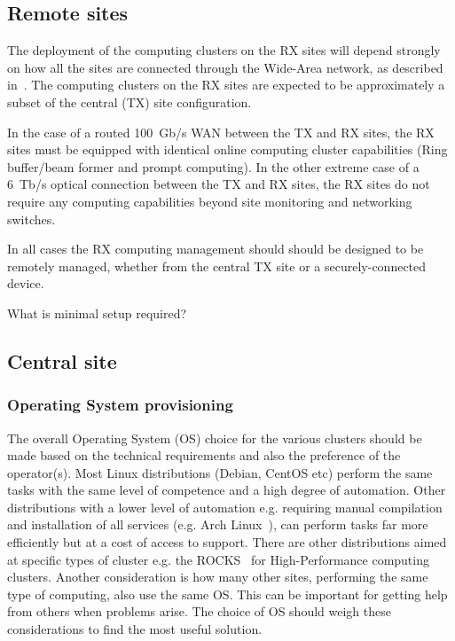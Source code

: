 \documentclass[12pt,a4paper]{article}
\begin{document}
\subsection{Remote sites}
\label{sec:remote}

The deployment of the computing clusters on the RX sites will depend strongly on how all the sites are connected through the Wide-Area network, as described in~\cite{e3dds-del-1-1}.
The computing clusters on the RX sites are expected to be  approximately a subset of the central (TX) site configuration.

In the case of a routed 100~Gb/s WAN between the TX and RX sites, the RX sites must be equipped with identical online computing cluster capabilities (Ring buffer/beam former and prompt computing).
In the other extreme case of a 6~Tb/s optical connection between the TX and RX sites, the RX sites do not require any computing capabilities beyond site monitoring and networking switches.

In all cases the RX computing management should should be designed to be remotely managed, whether from the central TX site or a securely-connected device.

What is minimal setup required?

\subsection{Central site}
\label{sec:central}


\subsubsection{Operating System provisioning}
\label{ssec:os-prov}
The overall Operating System (OS) choice for the various clusters should be made based on the technical requirements and also the preference of the operator(s).
Most Linux distributions (Debian, CentOS etc) perform the same tasks with the same level of competence and a high degree of automation.
Other distributions with a lower level of automation e.g. requiring manual compilation and installation of all services (e.g. Arch Linux~\cite{archlinux}), can perform tasks far more efficiently but at a cost of access to support.  
There are other distributions aimed at specific types of cluster e.g. the ROCKS~\cite{rocks} for High-Performance computing clusters.
Another consideration is how many other sites, performing the same type of computing, also use the same OS.
This can be important for getting help from others when problems arise.
The choice of OS should weigh these considerations to find the most useful solution.
\end{document}
